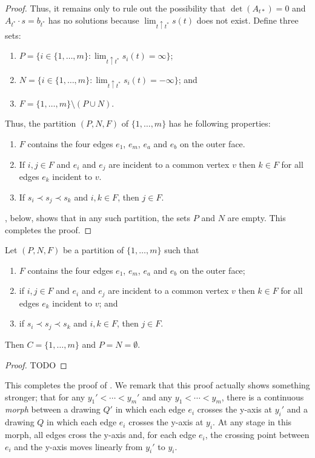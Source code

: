 \documentclass{patmorin}
\begin{document}
\begin{proof}
   Thus, it remains only to rule out the possibility that $\det(A_{t*})=0$
   and $A_{t^*}\cdot s=b_{t^*}$ has no solutions because $\lim_{t\uparrow
   t^*} s(t)$ does not exist.  Define three sets:
   \begin{enumerate}
     \item $P=\{i\in \{1,\ldots,m\}:\lim_{t\uparrow t^*} s_i(t)=\infty\}$;
     \item $N=\{i\in \{1,\ldots,m\}:\lim_{t\uparrow t^*} s_i(t)=-\infty\}$; and
     \item $F=\{1,\ldots,m\}\setminus (P\cup N)$.
   \end{enumerate}

   Thus, the partition $(P,N,F)$ of $\{1,\ldots,m\}$ has he following
   properties:
   \begin{enumerate}
    \item $F$ contains the four edges $e_1$, $e_m$, $e_a$ and $e_b$
      on the outer face.
    \item If $i,j\in F$ and $e_i$ and $e_j$ are incident to a common
      vertex $v$ then $k\in F$ for all edges $e_k$ incident to $v$.
    \item If $s_i \prec s_j \prec s_k$ and $i,k\in F$, 
      then $j\in F$.
   \end{enumerate}
   , below, shows that in any such partition, the sets
   $P$ and $N$ are empty.  This completes the proof.
\end{proof}

\begin{lem}
   Let $(P,N,F)$ be a partition of $\{1,\ldots,m\}$ such that 
   \begin{enumerate}
    \item $F$ contains the four edges $e_1$, $e_m$, $e_a$ and $e_b$
      on the outer face;
    \item if $i,j\in F$ and $e_i$ and $e_j$ are incident to a common
      vertex $v$ then $k\in F$ for all edges $e_k$ incident to $v$; and
    \item if $s_i \prec s_j \prec s_k$ and $i,k\in F$, 
      then $j\in F$.
   \end{enumerate}
   Then $C=\{1,\ldots,m\}$ and $P=N=\emptyset$.
\end{lem}

\begin{proof}
    TODO
\end{proof}

This completes the proof of .  We remark that this proof
actually shows something stronger; that for any $y_1'<\cdots<y_m'$ and
any $y_1<\cdots<y_m$, there is a continuous \emph{morph} \cite{x,y,z,w}
between a drawing $Q'$ in which each edge $e_i$ crosses the y-axis at
$y_i'$ and a drawing $Q$ in which each edge $e_i$ crosses the y-axis
at $y_i$.  At any stage in this morph, all edges cross the y-axis and,
for each edge $e_i$, the crossing point between $e_i$ and the y-axis
moves linearly from $y_i'$ to $y_i$.
\end{document}

